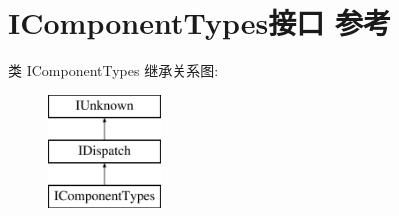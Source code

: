 \hypertarget{interface_i_component_types}{}\section{I\+Component\+Types接口 参考}
\label{interface_i_component_types}
类 I\+Component\+Types 继承关系图\+:\begin{figure}[H]
\begin{center}
\leavevmode
\includegraphics[height=3.000000cm]{interface_i_component_types}
\end{center}
\end{figure}
